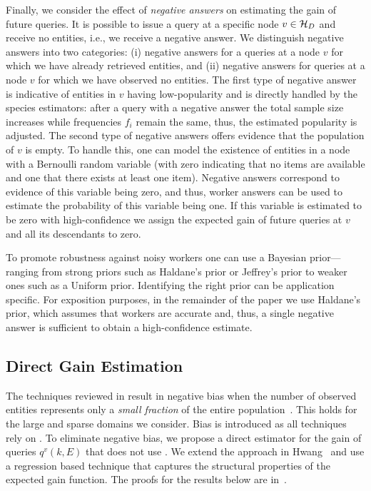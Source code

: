 \iftr
Finally, we consider the effect of {\em negative answers} on estimating the gain of future queries. It is possible to issue a query at a specific node $v \in \mathcal{H}_D$ and receive no entities, i.e., we receive a negative answer. We distinguish negative answers into two categories: (i) negative answers for a queries at a node $v$ for which we have already retrieved entities, and (ii) negative answers for queries at a node $v$ for which we have observed no entities. The first type of negative answer is indicative of entities in $v$ having low-popularity and is directly handled by the species estimators: after a query with a negative answer the total sample size increases while frequencies $f_i$ remain the same, thus, the estimated popularity is adjusted. The second type of negative answers offers evidence that the population of $v$ is empty. To handle this, one can model the existence of entities in a node with a Bernoulli random variable (with zero indicating that no items are available and one that there exists at least one item). Negative answers correspond to evidence of this variable being zero, and thus,  worker answers can be used to estimate the probability of this variable being one. If this variable is estimated to be zero with high-confidence we assign the expected gain of future queries at $v$ and all its descendants to zero.

To promote robustness against noisy workers one can use a Bayesian prior---ranging from strong priors such as Haldane's prior or Jeffrey's prior to weaker ones such as a Uniform prior. Identifying the right prior can be application specific. For exposition purposes, in the remainder of the paper we use Haldane's prior, which assumes that workers are accurate and, thus, a single negative answer is sufficient to obtain a high-confidence estimate.
\fi

\subsection{Direct Gain Estimation}
\label{sec:newestim}
The techniques reviewed in  result in negative bias when the number of observed entities represents only a {\em small fraction} of the entire population~\cite{hwang:2010, shen:2003}. This holds for the large and sparse domains we consider. Bias is introduced as all techniques rely on . To eliminate negative bias, we propose a direct estimator for the gain of queries $q^v(k,E)$ that does not use . We extend the approach in Hwang~\cite{hwang:2010} and use a regression based technique that captures the structural properties of the expected gain function.
\ifpaper
 The proofs for the results below are 
in~\cite{cruxsup}.
\fi

